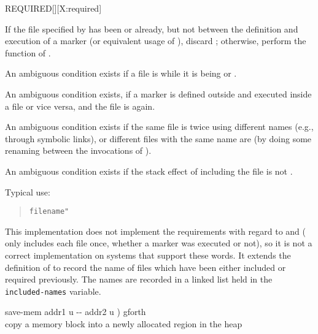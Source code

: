 \begin{worddef}{}{REQUIRED}[][X:required]
\item {}

	If the file specified by  has been 
	or  already, but not between the definition and
	execution of a marker (or equivalent usage of ),
	discard ; otherwise, perform the function of
	.

	An ambiguous condition exists if a file is  while
	it is being  or .

	An ambiguous condition exists, if a marker is defined outside and
	executed inside a file or vice versa, and the file is
	 again.

	An ambiguous condition exists if the same file is 
	twice using different names (e.g., through symbolic links), or
	different files with the same name are  (by doing
	some renaming between the invocations of ).

	An ambiguous condition exists if the stack effect of including the
	file is not .

	\begin{defer}
	\rationale
		Typical use:
		\begin{quote}
			 \texttt{filename"} 
		\end{quote}

	\implementation*
		This implementation does not implement the requirements with
		regard to  and  (
		only includes each file once, whether a marker was executed or
		not), so it is not a correct implementation on systems that
		support these words. It extends the definition of 
		to record the name of files which have been either included or
		required previously. The names are recorded in a linked list
		held in the \texttt{included-names} variable.

		\ttfamily
		\word{:} save-mem	 addr1 u -{}- addr2 u )  gforth \\
		 copy a memory block into a newly allocated region in the heap \\
		\tab {}  \\
		\tab {}   \\
		\tab {}   \word{ROT}   \word{;} \\


\end{defer}
\end{worddef}
